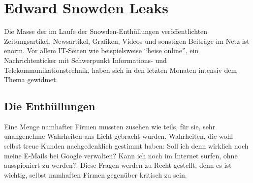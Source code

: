 \newpage
\section{Edward Snowden Leaks}
Die Masse der im Laufe der Snowden-Enthüllungen veröffentlichten Zeitungsartikel, Newsartikel, Grafiken, Videos und sonstigen Beiträge im Netz ist enorm.
Vor allem IT-Seiten wie beispielsweise ``heise online'', ein Nachrichtenticker mit Schwerpunkt Informations- und Telekommunikationstechnik, haben sich in den letzten Monaten intensiv dem Thema gewidmet.

\subsection{Die Enthüllungen}
Eine Menge namhafter Firmen mussten zusehen wie teils, für sie, sehr unangenehme Wahrheiten ans Licht gebracht wurden. Wahrheiten, die wohl selbst treue Kunden nachgedenklich gestimmt haben: Soll ich denn wirklich noch meine E-Mails bei Google verwalten? Kann ich noch im Internet surfen, ohne ausspioniert zu werden?. Diese Fragen werden zu Recht gestellt, denn es ist wichtig, selbst namhaften Firmen gegenüber kritisch zu sein.


